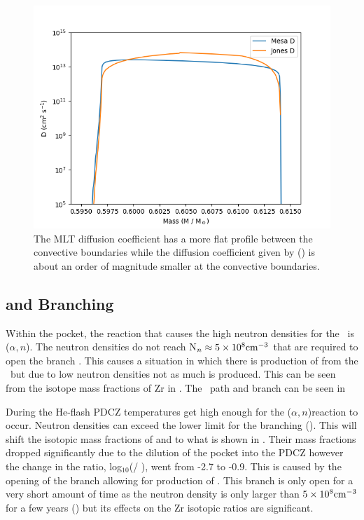 \documentclass[fleqn,usenatbib]{mnras}
\begin{document}
\begin{figure}
  \includegraphics[width=\columnwidth]{figs/Diffusion_compare.png}
  \caption{The MLT diffusion coefficient has a more flat profile between the convective boundaries while the diffusion coefficient given by \citep{4pi} () is about an order of magnitude smaller at the convective boundaries.} 
\end{figure}

\subsection{\zirconium[95] and \iodine[128] Branching}
\label{sec:branching}

Within the \carbon[13] pocket, the reaction that causes the high neutron densities for the \spr~is \carbon[13]($\alpha,n$)\oxygen[16]. The neutron densities do not reach N$_{n} \approx 5\times 10^{8}{\mathrm{c}\mathrm{m}}^{-3}$ that are required to open the \zirconium[95] branch \citep{zr}. This causes a situation in which there is production of \zirconium[94] from the \spr~but due to low neutron densities not as much \zirconium[96] is produced. This can be seen from the isotope mass fractions of Zr in . The \spr~path and \zirconium[95] branch can be seen in 

During the He-flash PDCZ temperatures get high enough for the \neon[22]($\alpha,n$)\magnesium[25] reaction to occur. Neutron densities can exceed the lower limit for the \zirconium[95] branching (). This will shift the isotopic mass fractions of \zirconium[96] and \zirconium[94] to what is shown in . Their mass fractions dropped significantly due to the dilution of the \carbon[13] pocket into the PDCZ however the change in the ratio, log$_{10}$(\zirconium[96] / \zirconium[94]), went from -2.7 to -0.9. This is caused by the opening of the \zirconium[95] branch allowing for production of \zirconium[96]. This branch is only open for a very short amount of time as the neutron density is only larger than  $5\times 10^{8}{\mathrm{c}\mathrm{m}}^{-3}$ for a few years () but its effects on the Zr isotopic ratios are significant. 
\end{document}
